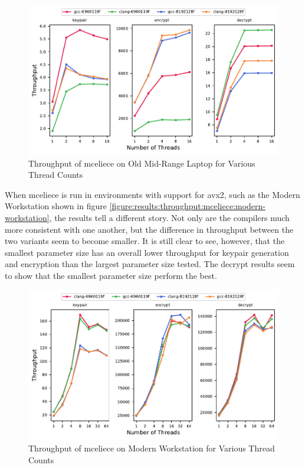 \begin{figure}
    \centering
    \includegraphics[scale=0.75]{chapters/results/throughput/Old Mid-Range Laptop_mceliece.pdf}
    \caption{Throughput of \gls{mceliece} on Old Mid-Range Laptop for Various Thread Counts}
    \label{figure:results:throughput:mceliece-old-mid-range-laptop}
\end{figure}

When \gls{mceliece} is run in environments with support for \gls{avx2}, such as the Modern Workstation shown in figure \ref{figure:results:throughput:mceliece:modern-workstation}, the results tell a different story. Not only are the compilers much more consistent with one another, but the difference in throughput between the two variants seem to become smaller. It is still clear to see, however, that the smallest parameter size has an overall lower throughput for keypair generation and encryption than the largest parameter size tested. The decrypt results seem to show that the smallest parameter size perform the best.

\begin{figure}
    \centering
    \includegraphics[scale=0.75]{chapters/results/throughput/Modern Workstation_mceliece.pdf}
    \caption{Throughput of \gls{mceliece} on Modern Workstation for Various Thread Counts}
    \label{figure:results:throughput:mceliece-modern-workstation}
\end{figure}

